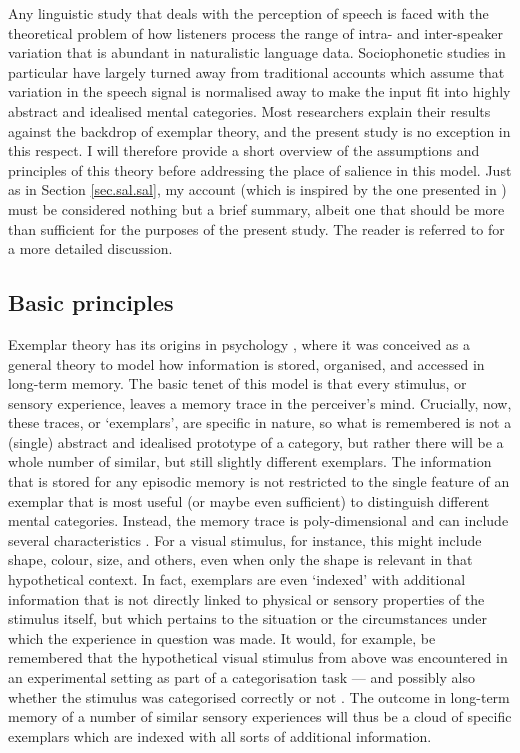 Any linguistic study that deals with the perception of speech is faced with the theoretical problem of how listeners process the range of intra- and inter-speaker variation that is abundant in naturalistic language data.
Sociophonetic studies in particular have largely turned away from traditional accounts which assume that variation in the speech signal is normalised away to make the input fit into highly abstract and idealised mental categories.
Most researchers explain their results against the backdrop of exemplar theory, and the present study is no exception in this respect.
I will therefore provide a short overview of the assumptions and principles of this theory before addressing the place of salience in this model.
Just as in Section \ref{sec.sal.sal}, my account (which is inspired by the one presented in \citealt{juskanma}) must be considered nothing but a brief summary, albeit one that should be more than sufficient for the purposes of the present study.
The reader is referred to \citealt{pierrehumbert2006} for a more detailed discussion.

		\subsection{Basic principles}
		\label{sec.sal.exemplar.basic}
		
Exemplar theory has its origins in psychology \parencite[cf.][]{medinschaffer1978}, where it was conceived as a general theory to model how information is stored, organised, and accessed in long-term memory.
The basic tenet of this model is that every stimulus, or sensory experience, leaves a memory trace in the perceiver's mind.
Crucially, now, these traces, or `exemplars', are specific in nature, so what is remembered is not a (single) abstract and idealised prototype of a category, but rather there will be a whole number of similar, but still slightly different exemplars.
The information that is stored for any episodic memory is not restricted to the single feature of an exemplar that is most useful (or maybe even sufficient) to distinguish different mental categories.
Instead, the memory trace is poly-dimensional and can include several characteristics \parencite[cf.][517]{pierrehumbert2006}.
For a visual stimulus, for instance, this might include shape, colour, size, and others, even when only the shape is relevant in that hypothetical context.
In fact, exemplars are even `indexed' with additional information that is not directly linked to physical or sensory properties of the stimulus itself, but which pertains to the situation or the circumstances under which the experience in question was made.
It would, for example, be remembered that the hypothetical visual stimulus from above was encountered in an experimental setting as part of a categorisation task --- and possibly also whether the stimulus was categorised correctly or not \parencite[cf.][210--212]{medinschaffer1978}.
The outcome in long-term memory of a number of similar sensory experiences will thus be a cloud of specific exemplars which are indexed with all sorts of additional information.

